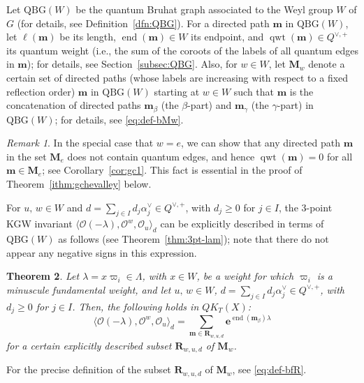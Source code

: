 \documentclass[11pt,a4paper,reqno,dvipdfmx]{amsart}
\numberwithin{equation}{section}
\newcommand{\CO}{\mathcal{O}}
\newcommand{\be}{\mathbf{e}}
\newcommand{\bm}{\mathbf{m}}
\newcommand{\bM}{\mathbf{M}}
\DeclareMathOperator{\qwt}{qwt}
\DeclareMathOperator{\ed}{end}
\newcommand{\QBG}{\mathrm{QBG}}
\newcommand{\bfR}{\mathbf{R}}
\theoremstyle{plain}
\newtheorem{ithm}{Theorem}
\theoremstyle{definition}
\theoremstyle{remark}
\newtheorem{irem}[ithm]{Remark}
\begin{document}
Let $\QBG(W)$ be the quantum Bruhat graph associated to 
the Weyl group $W$ of $G$ (for details, see Definition~\ref{dfn:QBG}). 
%
For a directed path $\bm$ in $\QBG(W)$, let $\ell(\bm)$ be its length, 
$\ed(\bm) \in W$ its endpoint, and $\qwt(\bm) \in Q^{\vee,+}$ 
its quantum weight (i.e., the sum of the coroots of the labels 
of all quantum edges in $\bm$); for details, see Section~\ref{subsec:QBG}. 
Also, for $w \in W$, let $\bM_{w}$ denote a certain set of 
directed paths (whose labels are increasing with respect to a fixed reflection order) 
$\bm$ in $\QBG(W)$ starting at $w \in W$ such that 
$\bm$ is the concatenation of directed paths 
$\bm_{\beta}$ (the $\beta$-part) and $\bm_{\gamma}$ (the $\gamma$-part) 
in $\QBG(W)$; for details, see \eqref{eq:def-bMw}.

\begin{irem}
In the special case that $w = e$, 
we can show that any directed path $\bm$ 
in the set $\bM_{e}$ does not contain quantum edges, 
and hence $\qwt(\bm) = 0$ for all $\bm \in \bM_{e}$; 
see Corollary~\ref{cor:gc1}. 
This fact is essential in the proof of Theorem~\ref{ithm:gchevalley} below. 
\end{irem} 

For $u,\,w \in W$ and 
$d = \sum_{j \in I} d_j \alpha_j^{\vee} \in Q^{\vee,+}$, with $d_j \geq 0$ for $j \in I$, 
the 3-point KGW invariant $\langle \CO(- \lambda), \CO^{w}, \CO_{u} \rangle_{d}$ 
can be explicitly described in terms of $\QBG(W)$ as follows (see Theorem~\ref{thm:3pt-lam}); 
note that there do not appear any negative signs in this expression. 
%
%
\begin{ithm}\label{ithm:minuscule}
Let $\lambda = x \varpi_i \in \Lambda$, 
with $x \in W$, be a weight for which $\varpi_i$ is a minuscule fundamental weight, 
and let $u,\,w \in W$, $d = \sum_{j \in I} d_j \alpha_j^{\vee} \in Q^{\vee,+}$, 
with $d_j \geq 0$ for $j \in I$. Then, the following holds in $QK_T(X)${\rm :} 
%
\begin{equation}
\langle \CO(- \lambda), \CO^{w}, \CO_{u} \rangle_{d} = 
\sum_{ \bm \in \bfR_{w, u, d} } \be^{\ed(\bm_{\beta}) \lambda}
\end{equation}
%
for a certain explicitly described subset $\bfR_{w, u, d}$ of $\bM_w$. 
\end{ithm}

For the precise definition of 
the subset $\bfR_{w, u, d}$ of $\bM_w$, see \eqref{eq:def-bfR}.
\end{document}
